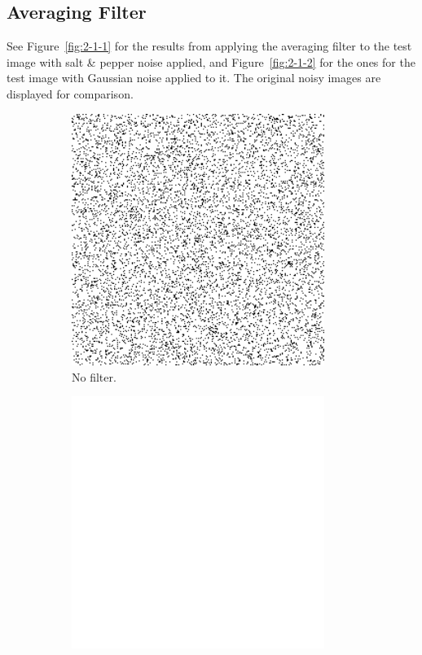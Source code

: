 \subsection{Averaging Filter}
See Figure~\ref{fig:2-1-1} for the results from applying the averaging filter to the test image with salt \& pepper noise applied, and Figure~\ref{fig:2-1-2} for the ones for the test image with Gaussian noise applied to it.
The original noisy images are displayed for comparison.

\begin{figure}[h]
    \centering

    \begin{subfigure}[b]{0.3\textwidth}
        \includegraphics[width=0.9\textwidth]{../code/2_out/2-1_sp.png}
        \caption{No filter.}
        \label{fig:2-1-1:1}
    \end{subfigure}
    \begin{subfigure}[b]{0.3\textwidth}
        \includegraphics[width=0.9\textwidth]{../code/2_out/2-1_sp_3x3.png}

\end{subfigure}
\end{figure}
